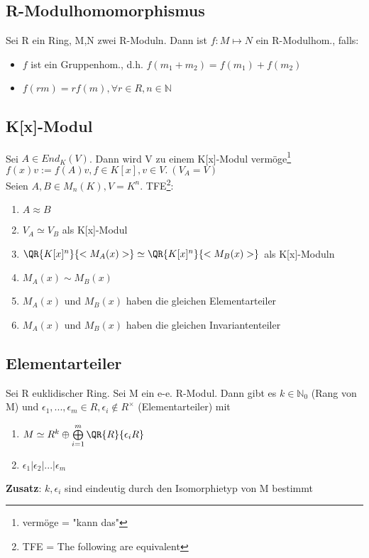 \subsection{R-Modulhomomorphismus}
\begin{definition}
Sei R ein Ring, M,N zwei R-Moduln. Dann ist $f:M\mapsto N$ ein R-Modulhom., falls:
\begin{itemize}
	\item $f$ ist ein Gruppenhom., d.h. $f(m_1+m_2) = f(m_1)+f(m_2)$
	\item $f(rm) = rf(m), \forall r \in R, n\in \mathbb{N}$
\end{itemize}
\end{definition}

\subsection{K[x]-Modul}
\begin{theorem}
Sei $A \in End_K(V)$. Dann wird V zu einem K[x]-Modul vermöge\footnote{vermöge = "kann das"} $f(x)v := f(A)v, f\in K[x], v \in V.~(V_A=V)$\\
Seien $A,B \in M_n(K), V=K^n$. TFE\footnote{TFE = The following are equivalent}:
\begin{enumerate}
	\item $A \approx B$
	\item $V_A \simeq V_B$ als K[x]-Modul
	\item $\QR{K[x]^n}{<M_A(x)>} \simeq \QR{K[x]^n}{<M_B(x)>}$ als K[x]-Moduln
	\item $M_A(x) \sim M_B(x)$
	\item $M_A(x)$ und $M_B(x)$ haben die gleichen Elementarteiler
	\item $M_A(x)$ und $M_B(x)$ haben die gleichen Invariantenteiler
\end{enumerate}
\end{theorem}

\subsection{Elementarteiler}
\begin{theorem}
Sei R euklidischer Ring. Sei M ein e-e. R-Modul. Dann gibt es $k \in \mathbb{N}_0$ (Rang von M) und $\epsilon_1,...,\epsilon_m \in R, \epsilon_i \notin R^\times$ (Elementarteiler) mit
\begin{enumerate}
	\item $M \simeq R^k \oplus \bigoplus \limits_{i=1}^m \QR{R}{\epsilon_i R}$
	\item $\epsilon_1 | \epsilon_2 | ... | \epsilon_m$
\end{enumerate}
\textbf{Zusatz}: $k,\epsilon_i$ sind eindeutig durch den Isomorphietyp von M bestimmt
\end{theorem}

